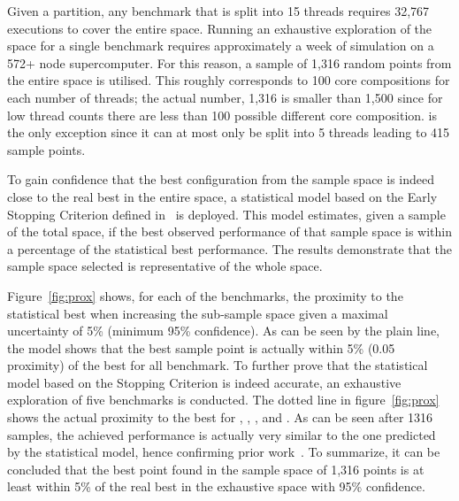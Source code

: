 Given a partition, any benchmark that is split into 15 threads requires 32,767 executions to cover the entire space.
Running an exhaustive exploration of the space for a single benchmark requires approximately a week of simulation on a 572+ node supercomputer.
For this reason, a sample of 1,316 random points from the entire space is utilised.
This roughly corresponds to 100 core compositions for each number of threads; the actual number, 1,316 is smaller than 1,500 since for low thread counts there are less than 100 possible different core composition.
 is the only exception since it can at most only be split into 5 threads leading to 415 sample points.

To gain confidence that the best configuration from the sample space is indeed close to the real best in the entire space, a statistical model based on the Early Stopping Criterion defined in~\cite{vuduc2003AutomaticPerf} is deployed. 
This model estimates, given a sample of the total space, if the best observed performance of that sample space is within a percentage of the statistical best performance.
The results demonstrate that the sample space selected is representative of the whole space.

Figure~\ref{fig:prox} shows, for each of the benchmarks, the proximity to the statistical best when increasing the sub-sample space given a maximal uncertainty of 5\%  (\ie minimum 95\% confidence).
As can be seen by the plain line, the model shows that the best sample point is actually within 5\% (0.05 proximity) of the best for all benchmark.
To further prove that the statistical model based on the Stopping Criterion is indeed accurate, an exhaustive exploration of five benchmarks is conducted.
The dotted line in figure~\ref{fig:prox} shows the actual proximity to the best for , , ,  and .
As can be seen after 1316 samples, the achieved performance is actually very similar to the one predicted by the statistical model, hence confirming prior work~\cite{vuduc2003AutomaticPerf}.
To summarize, it can be concluded that the best point found in the sample space of 1,316 points is at least within 5\% of the real best in the exhaustive space with 95\% confidence.